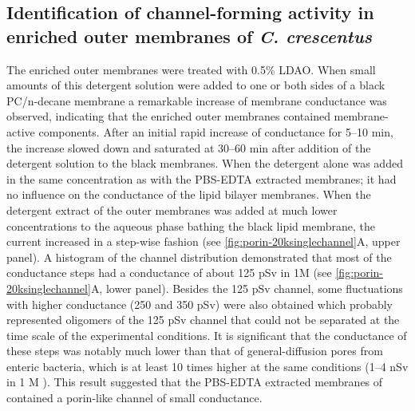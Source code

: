 \subsection{Identification of channel-forming activity in enriched outer membranes of \textit{C. crescentus}}
The enriched outer membranes were treated with 0.5\% \ac{LDAO}. When small amounts of this detergent solution were added to one or both sides of a black \ac{PC}/n-decane membrane a remarkable increase of membrane conductance was observed, indicating that the enriched outer membranes contained membrane-active components. %
After an initial rapid increase of conductance for 5--10 min, the increase slowed down and saturated at 30--60 min after addition of the detergent solution to the black membranes. When the detergent alone was added in the same concentration as with the \ac{PBS}-\ac{EDTA} extracted membranes; it had no influence on the conductance of the lipid bilayer membranes. When the detergent extract of the outer membranes was added at much lower concentrations to the aqueous phase bathing the black lipid membrane, the current increased in a step-wise fashion (see \cref{fig:porin-20ksinglechannel}A, upper panel). A histogram of the channel distribution demonstrated that most of the conductance steps had a conductance of about 125 \si{\pico\sievert} in 1M  (see \cref{fig:porin-20ksinglechannel}A, lower panel). Besides the 125 \si{\pico\sievert} channel, some fluctuations with higher conductance (250 and 350 \si{\pico\sievert}) were also obtained which probably represented oligomers of the 125 \si{\pico\sievert} channel that could not be separated at the time scale of the experimental conditions. It is significant that the conductance of these steps was notably much lower than that of general-diffusion pores from enteric bacteria, which is at least 10 times higher at the same conditions (1--4 \si{\nano\sievert} in 1 M ). This result suggested that the \ac{PBS}-\ac{EDTA} extracted membranes of \caulobacter contained a porin-like channel of small conductance. 

